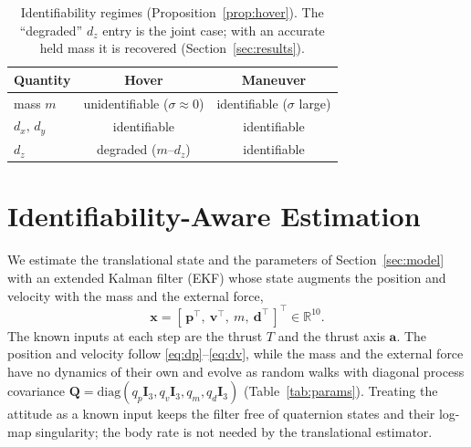 \documentclass{ieeeaccess}
\newcommand{\R}{\mathbb{R}}
\newcommand{\vect}[1]{\bm{#1}}
\newcommand{\mat}[1]{\mathbf{#1}}
\begin{document}
\begin{table}[t]
\centering
\caption{Identifiability regimes (Proposition~\ref{prop:hover}). The ``degraded''
$d_z$ entry is the joint case; with an accurate held mass it is recovered
(Section~\ref{sec:results}).}
\label{tab:obs}
\begin{tabular}{lcc}
\toprule
Quantity & Hover & Maneuver \\
\midrule
mass $m$        & unidentifiable ($\sigma\!\approx\!0$)         & identifiable ($\sigma$ large) \\
$d_x,\,d_y$     & identifiable                                  & identifiable \\
$d_z$           & degraded ($m$--$d_z$)                       & identifiable \\
\bottomrule
\end{tabular}
\end{table}

\section{Identifiability-Aware Estimation}\label{sec:mhe}

We estimate the translational state and the parameters of
Section~\ref{sec:model} with an extended Kalman filter (EKF) whose state augments
the position and velocity with the mass and the external force,
\begin{equation}
\vect{x}=[\,\vect{p}^{\!\top},\ \vect{v}^{\!\top},\ m,\ \vect{d}^{\!\top}\,]^{\!\top}\in\R^{10}.
\label{eq:state}
\end{equation}
The known inputs at each step are the thrust $T$ and the thrust axis $\vect{a}$.
The position and velocity follow \eqref{eq:dp}--\eqref{eq:dv}, while the mass and
the external force have no dynamics of their own and evolve as random walks with
diagonal process covariance $\mat{Q}=\mathrm{diag}(q_p\mat{I}_3,q_v\mat{I}_3,q_m,q_d\mat{I}_3)$
(Table~\ref{tab:params}). Treating the
attitude as a known input keeps the filter free of quaternion states and their
log-map singularity; the body rate is not needed by the translational estimator.
\end{document}
